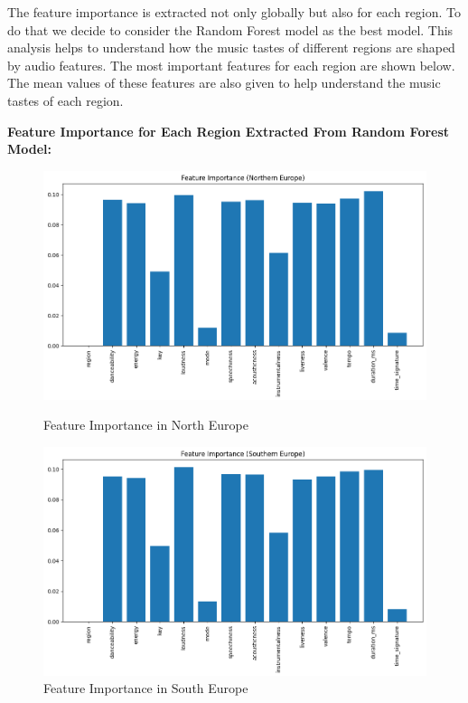 The feature importance is extracted not only globally but also for each region. To do that we decide to consider the Random Forest model as the best model.
This analysis helps to understand how the music tastes of different regions are shaped by audio features.
The most important features for each region are shown below. The mean values of these features are also given to help understand the music tastes of each region.

\textbf{Feature Importance for Each Region Extracted From Random Forest Model:}
\begin{figure}[h]
    \centering
    \begin{minipage}{0.45\textwidth}
        \centering
        \includegraphics[width=\linewidth]{media/rf_feature_imp_northen_europe.png}
        \caption{Feature Importance in North Europe}
    \end{minipage}%
    \hspace{0.05\textwidth} %
    \begin{minipage}{0.45\textwidth}
        \centering
        \includegraphics[width=\linewidth]{media/rf_feature_imp_southern_europe.png}
        \caption{Feature Importance in South Europe}
    \end{minipage}
\end{figure}
